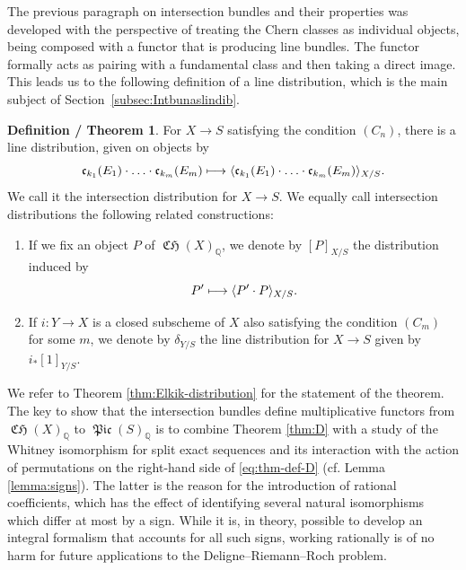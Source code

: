 \documentclass[11pt]{article}
\newcommand{\cf}{cf.\xspace}
\newcommand\mto{\mathchoice{\longmapsto}{\mapsto}{\mapsto}{\mapsto}}
\theoremstyle{plain}
\theoremstyle{definition}
\newtheorem{defthm}[thm]{Definition / Theorem}
\newcommand{\QBbb}{\mathbb Q}
\newcommand{\cfrak}{\mathfrak c}
\DeclareMathOperator{\CHfrak}{\mathfrak{CH}}
\DeclareMathOperator{\Picfr}{\mathfrak{Pic}}
\begin{document}
The previous paragraph on intersection bundles and their properties was developed with the perspective of treating the Chern classes as individual objects, being composed with a functor that is producing line bundles. The functor formally acts as pairing with a fundamental class and then taking a direct image. This leads us to the following definition of a line distribution, which is the main subject of Section~\ref{subsec:Intbunaslindib}.

\begin{defthm}
For $X \to S$ satisfying the condition $(C_{n})$, there is a line distribution, given on objects by
\begin{equation}\label{eq:thm-def-D}
\cfrak_{k_1}(E_1) \cdot \ldots \cdot \cfrak_{k_m}(E_m) \mto \langle \cfrak_{k_1}(E_1) \cdot \ldots \cdot \cfrak_{k_m}(E_m) \rangle_{X/S}.
\end{equation}
We call it the intersection distribution for $X\to S$. We equally call intersection distributions the following related constructions:

\begin{enumerate}
\item If we fix an object $P$ of $\CHfrak(X)_\QBbb$, we denote by $[P]_{X/S}$ the distribution induced by
\begin{displaymath}
P^{\prime} \mto \langle P^{\prime} \cdot P \rangle_{X/S}.
\end{displaymath}
\item If $i\colon Y \to X$ is a closed subscheme of $X$ also satisfying the condition $(C_m)$ for some $m$, we denote by $\delta_{Y/S}$ the line distribution for $X\to S$ given by $ i_\ast [1]_{Y/S}$.
\end{enumerate}

\end{defthm}
We refer to Theorem \ref{thm:Elkik-distribution} for the statement of the theorem. The key to show that the intersection bundles define multiplicative functors from $\CHfrak(X)_{\QBbb}$ to $\Picfr(S)_{\QBbb}$ is to combine Theorem \ref{thm:D} with a study of the Whitney isomorphism for split exact sequences and its interaction with the action of permutations on the right-hand side of \eqref{eq:thm-def-D} (\cf Lemma \ref{lemma:signs}). The latter is the reason for the introduction of rational coefficients, which has the effect of identifying several natural isomorphisms which differ at most by a sign. While it is, in theory, possible to develop an integral formalism that accounts for all such signs, working rationally is of no harm for future applications to the Deligne--Riemann--Roch problem.
\end{document}
